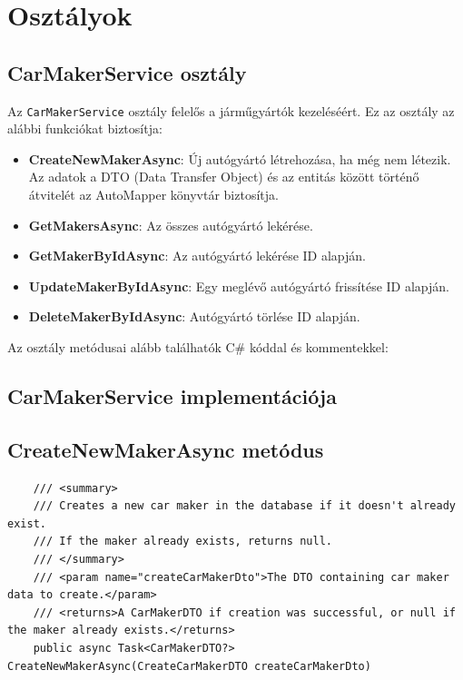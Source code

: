 \documentclass{report}[11pt]
\begin{document}
\section{Osztályok}

\subsection{CarMakerService osztály}

Az \texttt{CarMakerService} osztály felelős a járműgyártók kezeléséért. Ez az osztály az alábbi funkciókat biztosítja:

\begin{itemize}
    \item \textbf{CreateNewMakerAsync}: Új autógyártó létrehozása, ha még nem létezik. Az adatok a DTO (Data Transfer Object) és az entitás között történő átvitelét az AutoMapper könyvtár biztosítja.
    \item \textbf{GetMakersAsync}: Az összes autógyártó lekérése.
    \item \textbf{GetMakerByIdAsync}: Az autógyártó lekérése ID alapján.
    \item \textbf{UpdateMakerByIdAsync}: Egy meglévő autógyártó frissítése ID alapján.
    \item \textbf{DeleteMakerByIdAsync}: Autógyártó törlése ID alapján.
\end{itemize}


Az osztály metódusai alább találhatók C\# kóddal és kommentekkel:

\subsection{CarMakerService implementációja}

\subsection*{CreateNewMakerAsync metódus}
\begin{lstlisting}
    /// <summary>
    /// Creates a new car maker in the database if it doesn't already exist.
    /// If the maker already exists, returns null.
    /// </summary>
    /// <param name="createCarMakerDto">The DTO containing car maker data to create.</param>
    /// <returns>A CarMakerDTO if creation was successful, or null if the maker already exists.</returns>
    public async Task<CarMakerDTO?> CreateNewMakerAsync(CreateCarMakerDTO createCarMakerDto)
\end{lstlisting}
\end{document}

